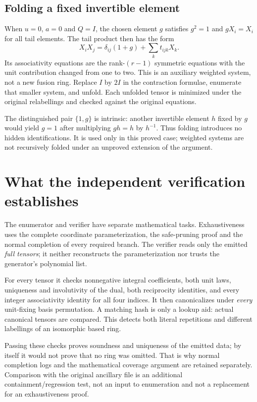 \documentclass[11pt,a4paper]{article}
\theoremstyle{definition}\newtheorem{definition}[theorem]{Definition}\newtheorem{remark}[theorem]{Remark}
\begin{document}
\subsection{Folding a fixed invertible element}
When $u=0$, $a=0$ and $Q=I$, the chosen element $g$ satisfies $g^2=1$ and
$gX_i=X_i$ for all tail elements. The tail product then has the form
\[
 X_iX_j=\delta_{ij}(1+g)+\sum_k t_{ijk}X_k.
\]
Its associativity equations are the rank-$(r-1)$ symmetric equations with the
unit contribution changed from one to two. This is an auxiliary weighted
system, not a new fusion ring. Replace $I$ by $2I$ in the contraction formulae,
enumerate that smaller system, and unfold. Each unfolded tensor is minimized
under the original relabellings and checked against the original equations.

The distinguished pair $\{1,g\}$ is intrinsic: another invertible element
$h$ fixed by $g$ would yield $g=1$ after multiplying $gh=h$ by $h^{-1}$.
Thus folding introduces no hidden identifications. It is used only in this
proved case; weighted systems are not recursively folded under an unproved
extension of the argument.

\section{What the independent verification establishes}
The enumerator and verifier have separate mathematical tasks. Exhaustiveness
uses the complete coordinate parameterization, the safe-pruning proof and the
normal completion of every required branch. The verifier reads only the emitted
\emph{full tensors}; it neither reconstructs the parameterization nor trusts the
generator's polynomial list.

For every tensor it checks nonnegative integral coefficients, both unit laws,
uniqueness and involutivity of the dual, both reciprocity identities, and every
integer associativity identity for all four indices. It then canonicalizes
under \emph{every} unit-fixing basis permutation. A matching hash is only a
lookup aid: actual canonical tensors are compared. This detects both literal
repetitions and different labellings of an isomorphic based ring.

Passing these checks proves soundness and uniqueness of the emitted data; by
itself it would not prove that no ring was omitted. That is why normal completion
logs and the mathematical coverage argument are retained separately. Comparison
with the original ancillary file is an additional containment/regression test,
not an input to enumeration and not a replacement for an exhaustiveness proof.
\end{document}
